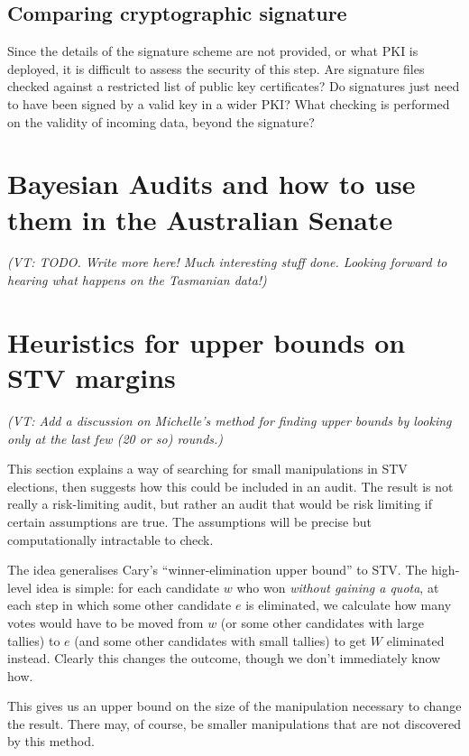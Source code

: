 \documentclass[10pt,a4paper]{article}
\newcommand{\VTNote}[1]{{\it(VT: #1)}}
\begin{document}
\subsection{Comparing cryptographic signature}
Since the details of the signature scheme are not provided, or what PKI is deployed, it is difficult to assess the security of this step. Are signature files checked against a restricted list of public key certificates? Do signatures just need to have been signed by a valid key in a wider PKI? What checking is performed on the validity of incoming data, beyond the signature?



\section{Bayesian Audits and how to use them in the Australian Senate}  \label{sec:bayes}
\VTNote{TODO.  Write more here!  Much interesting stuff done.  Looking forward to hearing what happens on the Tasmanian data!}


\section{Heuristics for upper bounds on STV margins}  \label{sec:winnerElimination}
\VTNote{Add a discussion on Michelle's method for finding upper bounds by looking only at the last few (20 or so) rounds.}

This section explains a way of searching for small manipulations in STV elections, then suggests how this could be included in an audit.  The result is not really a risk-limiting audit, but rather an audit that would be risk limiting if certain assumptions are true.  The assumptions will be precise but computationally intractable to check. 

The idea generalises Cary's ``winner-elimination upper bound'' to STV.  The high-level idea is simple: for each candidate $w$ who won \emph{without gaining a quota}, at each step in which some other candidate $e$ is eliminated, we calculate how many votes would have to be moved from $w$ (or some other candidates with large tallies) to $e$ (and some other candidates with small tallies) to get $W$ eliminated instead.   Clearly this changes the outcome, though we don't immediately know how.

This gives us an upper bound on the size of the manipulation necessary to change the result.  There may, of course, be smaller manipulations that are not discovered by this method.  
\end{document}
